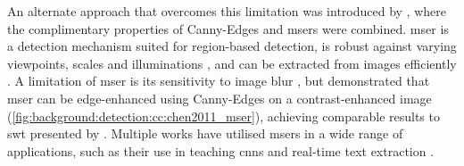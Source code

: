 An alternate approach that overcomes this limitation was introduced by \citet{Chen:2011ul}, where the complimentary properties of Canny-Edges \citep{Canny:1986uw} and \glspl{mser} \citep{Matas:2002tp} were combined. \gls{mser} is a detection mechanism suited for region-based detection, is robust against varying viewpoints, scales and illuminations \citep{Mikolajczyk:2005tb}, and can be extracted from images efficiently \citep{Nister:2008vk}. A limitation of \gls{mser} is its sensitivity to image blur \citep{Mikolajczyk:2005tb}, but \citeauthor{Chen:2011ul} demonstrated that \gls{mser} can be edge-enhanced using Canny-Edges on a contrast-enhanced image (\cref{fig:background:detection:cc:chen2011_mser}), achieving comparable results to \gls{swt} presented by \citet{Epshtein:2010tj}. Multiple works have utilised \glspl{mser} in a wide range of applications, such as their use in teaching \glspl{cnn} and real-time text extraction \cite{Li:2012wd,Gonzalez:2012wo,Kundu:2015vq,XiaomingHuang:2015fb,Zagoruyko:2015da}.

